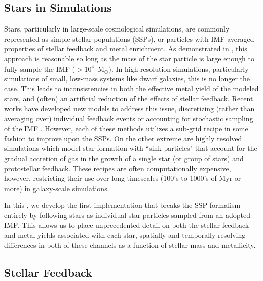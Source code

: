 
\subsection{Stars in Simulations} \label{intro:sec:stars}

Stars, particularly in large-scale cosmological simulations, are commonly represented as simple stellar populations (SSPs), or particles with IMF-averaged properties of stellar feedback and metal enrichment. As demonstrated in \cite{Revaz2016}, this approach is reasonable so long as the mass of the star particle is large enough to fully sample the IMF ($> 10^{4}$~M$_{\odot}$). In high resolution simulations, particularly simulations of small, low-mass systems like dwarf galaxies, this is no longer the case. This leads to inconsistencies in both the effective metal yield of the modeled stars, and (often) an artificial reduction of the effects of stellar feedback. Recent works have developed new models to address this issue, discretizing (rather than averaging over) individual feedback events \citep[e.g.][]{MUGS2010,FIRE,Hopkins2018,Rosdahl2018} or accounting for stochastic sampling of the IMF \citep{Hu2016,Hu2017,Applebaum2018,Su2018}. However, each of these methods utilizes a sub-grid recipe in some fashion to improve upon the SSPs. On the other extreme are highly resolved simulations which model star formation with ``sink particles" \citep[see for example ][]{Krumholz2004,Federrath2010,GongOstriker2013,BleulerTeyssier2014,Sormani2017} that account for the gradual accretion of gas in the growth of a single star (or group of stars) and protostellar feedback. These recipes are often computationally expensive, however, restricting their use over long timescales (100's to 1000's of Myr or more) in galaxy-scale simulations.

In this \Dissertation, we develop the first implementation that breaks the SSP formalism entirely by following stars as individual star particles sampled from an adopted IMF. This allows us to place unprecedented detail on both the stellar feedback and metal yields associated with each star, spatially and temporally resolving differences in both of these channels as a function of stellar mass and metallicity.

\subsection{Stellar Feedback} \label{intro:sec:feedback}

